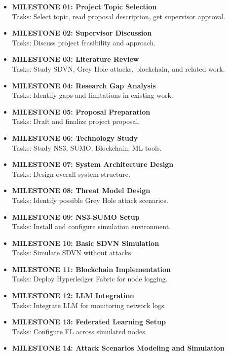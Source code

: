 \documentclass[12pt, a4paper]{report}
\begin{document}
\begin{itemize}
    \item \textbf{MILESTONE 01: Project Topic Selection} \\
    Tasks: Select topic, read proposal description, get supervisor approval.
    \item \textbf{MILESTONE 02: Supervisor Discussion} \\
    Tasks: Discuss project feasibility and approach.
    \item \textbf{MILESTONE 03: Literature Review} \\
    Tasks: Study SDVN, Grey Hole attacks, blockchain, and related work.
    \item \textbf{MILESTONE 04: Research Gap Analysis} \\
    Tasks: Identify gaps and limitations in existing work.
    \item \textbf{MILESTONE 05: Proposal Preparation} \\
    Tasks: Draft and finalize project proposal.
    \item \textbf{MILESTONE 06: Technology Study} \\
    Tasks: Study NS3, SUMO, Blockchain, ML tools.
    \item \textbf{MILESTONE 07: System Architecture Design} \\
    Tasks: Design overall system structure.
    \item \textbf{MILESTONE 08: Threat Model Design} \\
    Tasks: Identify possible Grey Hole attack scenarios.
    \item \textbf{MILESTONE 09: NS3-SUMO Setup} \\
    Tasks: Install and configure simulation environment.
    \item \textbf{MILESTONE 10: Basic SDVN Simulation} \\
    Tasks: Simulate SDVN without attacks.
    \item \textbf{MILESTONE 11: Blockchain Implementation} \\
    Tasks: Deploy Hyperledger Fabric for node logging.
    \item \textbf{MILESTONE 12: LLM Integration} \\
    Tasks: Integrate LLM for monitoring network logs.
    \item \textbf{MILESTONE 13: Federated Learning Setup} \\
    Tasks: Configure FL across simulated nodes.
    \item \textbf{MILESTONE 14: Attack Scenarios Modeling and Simulation} \\

\end{itemize}
\end{document}
